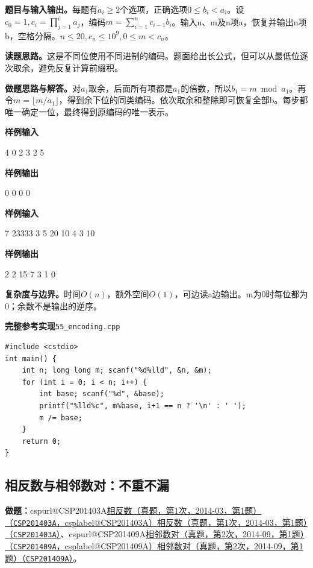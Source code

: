 \documentclass[UTF8,11pt,a4paper,fontset=none]{ctexart}
\makeatletter
\newcommand{\csp}[2]{\ifcsname cspurl@#1\endcsname\href{\csname cspurl@#1\endcsname}{#2（\texttt{#1}，\csname csplabel@#1\endcsname）}\else\href{https://oj.shumeng.tech/p/#1}{#2（\texttt{#1}）}\fi}
\makeatother
\begin{document}
\noindent\textbf{题目与输入输出。}每题有$a_i\ge2$个选项，正确选项$0\le b_i<a_i$。设$c_0=1,c_i=\prod_{j=1}^i a_j$，编码$m=\sum_{i=1}^n c_{i-1}b_i$。输入n、m及n项a，恢复并输出n项b，空格分隔。$n\le20,c_n\le10^9,0\le m<c_n$。

\noindent\textbf{读题思路。}这是不同位使用不同进制的编码。题面给出长公式，但可以从最低位逐次取余，避免反复计算前缀积。

\noindent\textbf{做题思路与解答。}对$a_1$取余，后面所有项都是$a_1$的倍数，所以$b_1=m\bmod a_1$。再令$m=\lfloor m/a_1\rfloor$，得到余下位的同类编码。依次取余和整除即可恢复全部b。每步都唯一确定一位，最终得到原编码的唯一表示。
\begin{tcolorbox}[samplebox,title={输入输出样例}]
\textbf{样例输入}
\begin{Sample}
4 0
2 3 2 5
\end{Sample}
\tcblower
\textbf{样例输出}
\begin{Sample}
0 0 0 0
\end{Sample}
\end{tcolorbox}
\begin{tcolorbox}[samplebox,title={输入输出样例}]
\textbf{样例输入}
\begin{Sample}
7 23333
3 5 20 10 4 3 10
\end{Sample}
\tcblower
\textbf{样例输出}
\begin{Sample}
2 2 15 7 3 1 0
\end{Sample}
\end{tcolorbox}

\noindent\textbf{复杂度与边界。}时间$O(n)$，额外空间$O(1)$，可边读a边输出。m为0时每位都为0；余数不是输出的逆序。
\par\noindent\begin{minipage}{\linewidth}
\textbf{完整参考实现}\quad\texttt{55\_encoding.cpp}
\begin{lstlisting}
#include <cstdio>
int main() {
    int n; long long m; scanf("%d%lld", &n, &m);
    for (int i = 0; i < n; i++) {
        int base; scanf("%d", &base);
        printf("%lld%c", m%base, i+1 == n ? '\n' : ' ');
        m /= base;
    }
    return 0;
}
\end{lstlisting}
\end{minipage}\par

\subsection{相反数与相邻数对：不重不漏}

\noindent\textbf{做题：}\csp{CSP201403A}{相反数（真题，第1次，2014-03，第1题）}、\csp{CSP201409A}{相邻数对（真题，第2次，2014-09，第1题）}。
\end{document}
